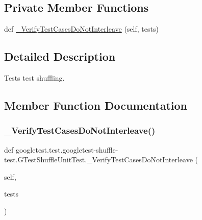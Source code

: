 \subsection*{Private Member Functions}
\begin{DoxyCompactItemize}
\item 
def \mbox{\hyperlink{classgoogletest_1_1test_1_1googletest-shuffle-test_1_1_g_test_shuffle_unit_test_a9843023f532f925ab12782e294d33a7d}{\+\_\+\+Verify\+Test\+Cases\+Do\+Not\+Interleave}} (self, tests)
\end{DoxyCompactItemize}


\subsection{Detailed Description}
\begin{DoxyVerb}Tests test shuffling.\end{DoxyVerb}
 

\subsection{Member Function Documentation}
\mbox{\label{classgoogletest_1_1test_1_1googletest-shuffle-test_1_1_g_test_shuffle_unit_test_a9843023f532f925ab12782e294d33a7d}} 
\subsubsection{\texorpdfstring{\_VerifyTestCasesDoNotInterleave()}{\_VerifyTestCasesDoNotInterleave()}}
{\footnotesize\ttfamily def googletest.\+test.\+googletest-\/shuffle-\/test.\+G\+Test\+Shuffle\+Unit\+Test.\+\_\+\+Verify\+Test\+Cases\+Do\+Not\+Interleave (\begin{DoxyParamCaption}\item[{}]{self,  }\item[{}]{tests }\end{DoxyParamCaption})\hspace{0.3cm}{\ttfamily [private]}}

